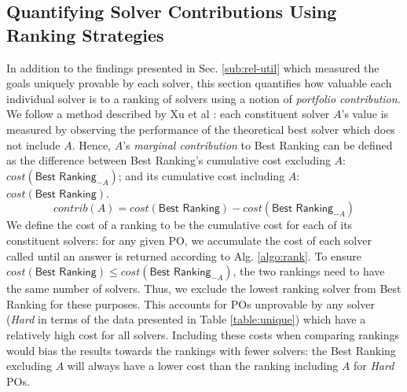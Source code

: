 \subsection{Quantifying Solver Contributions Using Ranking Strategies}

\sloppypar
In addition to the findings presented in Sec. \ref{sub:rel-util} which measured the goals uniquely provable by each solver, this section quantifies how valuable each individual solver is to a ranking of solvers using a notion of \textit{portfolio contribution}.
We follow a method described by Xu et al \cite{Xu2012}: each constituent solver $A$'s value is measured by observing the performance of the theoretical best solver which does not include $A$.
Hence, $A$'s \textit{marginal contribution} to \textsf{Best Ranking} can be defined as the difference between \textsf{Best Ranking}'s cumulative cost excluding $A$: $cost(\textsf{Best Ranking}_{-A})$; and its cumulative cost including $A$: $cost(\textsf{Best Ranking})$.
\[
	contrib(A) = cost(\textsf{Best Ranking}) - cost(\textsf{Best Ranking}_{-A})
\]
We define the cost of a ranking to be the cumulative cost for each of its constituent solvers:
for any given PO, we accumulate the cost of each solver called until an answer is returned according to Alg. \ref{algo:rank}.
To ensure $cost(\textsf{Best Ranking}) \leq cost(\textsf{Best Ranking}_{-A})$, the two rankings need to have the same number of solvers. 
Thus, we exclude the lowest ranking solver from \textsf{Best Ranking} for these purposes.
This accounts for POs unprovable by any solver (\textit{Hard} in terms of the data presented in Table \ref{table:unique}) which have a relatively high cost for all solvers. 
Including these costs when comparing rankings would bias the results towards the rankings with fewer solvers: the \textsf{Best Ranking} excluding $A$ will always have a lower cost than the ranking including $A$ for \textit{Hard} POs.   

